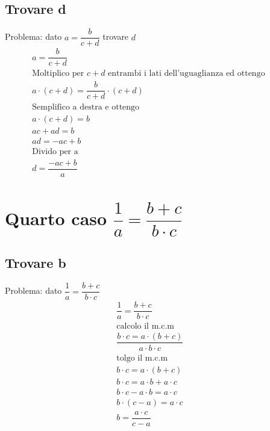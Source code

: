 \subsection{Trovare d}
\label{sec:terzocasosemptrovared}
Problema: dato $a=\dfrac{b}{c+d}$ trovare $d$
\begin{align*}
a=\dfrac{b}{c+d}&&\\
\text{Moltiplico per $c+d$ entrambi i lati dell'uguaglianza ed ottengo }\\
a\cdot (c+d)=\dfrac{b}{c+d}\cdot(c+d)&&\\
\text{Semplifico a destra e ottengo}\\
a\cdot (c+d)=b&&\\
ac+ad=b&&\\
ad=-ac+b&&\\
\text{Divido per a}\\
d=\dfrac{-ac+b}{a}
\end{align*}
\section[Quarto caso]{Quarto caso $\dfrac{1}{a}=\dfrac{b+ c}{b\cdot c}$}
\label{sec:quartocasosemp}
\subsection{Trovare b}
\label{sec:quartocasosemptrovareb}
Problema: dato $\dfrac{1}{a}=\dfrac{b+ c}{b\cdot c}$
\begin{align*}
\dfrac{1}{a}=\dfrac{b+ c}{b\cdot c}&&\\
\text{calcolo il m.c.m }\\
\dfrac{b\cdot c=a\cdot(b+c)}{a\cdot b\cdot c}&&\\
\text{tolgo il m.c.m }\\
b\cdot c=a\cdot(b+c)&&\\
b\cdot c=a\cdot b+a\cdot c &&\\
b\cdot c-a\cdot b=a\cdot c &&\\
b\cdot (c-a)=a\cdot c &&\\
b=\dfrac{a\cdot c}{c-a}
\end{align*}

